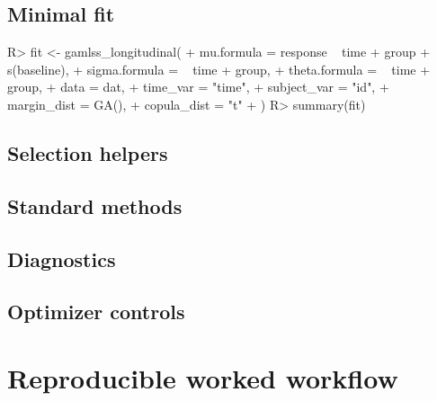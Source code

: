\documentclass{jss}
\begin{document}

\subsection{Minimal fit}

\begin{CodeChunk}
\begin{CodeInput}
R> fit <- gamlss_longitudinal(
+    mu.formula = response ~ time + group + s(baseline),
+    sigma.formula = ~ time + group,
+    theta.formula = ~ time + group,
+    data = dat,
+    time_var = "time",
+    subject_var = "id",
+    margin_dist = GA(),
+    copula_dist = "t"
+  )
R> summary(fit)
\end{CodeInput}
\end{CodeChunk}

\subsection{Selection helpers}


\subsection{Standard methods}


\subsection{Diagnostics}


\subsection{Optimizer controls}


\section{Reproducible worked workflow}
\end{document}
